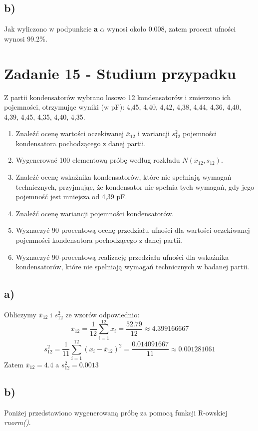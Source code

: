 \documentclass{article}
\begin{document}
\subsection{b)}
Jak wyliczono w podpunkcie \textbf{a} $\alpha$ wynosi około 0.008, zatem procent ufności wynosi 99.2\%.

\newpage
\section{Zadanie 15 - Studium przypadku}
Z partii kondensatorów wybrano losowo 12 kondensatorów i zmierzono ich pojemności, otrzymując wyniki (w pF):
4,45, 4,40, 4,42, 4,38, 4,44, 4,36, 4,40, 4,39, 4,45, 4,35, 4,40, 4,35.
\begin{enumerate}[label = \alph*)]
\item Znaleźć ocenę wartości oczekiwanej $\overline{x}_{12}$ i wariancji $s_{12}^2$ pojemności kondensatora pochodzącego z danej partii.
\item Wygenerować 100 elementową próbę według rozkładu $N(\overline{x}_{12},s_{12})$.
\item Znaleźć ocenę wskaźnika kondensatorów, które nie spełniają wymagań technicznych, przyjmując, że kondensator nie spełnia tych wymagań, gdy jego pojemność jest mniejsza od 4,39 pF.
\item Znaleźć ocenę wariancji pojemności kondensatorów.
\item Wyznaczyć 90-procentową ocenę przedziału ufności dla wartości oczekiwanej pojemności kondensatora pochodzącego z danej partii.
\item Wyznaczyć 90-procentową realizację przedziału ufności dla wskaźnika kondensatorów, które nie spełniają wymagań technicznych w badanej partii.
\end{enumerate}

\subsection{a)}
Obliczymy $\overline{x}_{12}$ i $s_{12}^2$ ze wzorów odpowiednio:
\[ \overline{x}_{12} = \frac{1}{12} \sum_{i=1}^{12} x_i = \frac{52.79}{12} \approx 4.399166667 \]
\[ s_{12}^2 = \frac{1}{11} \sum_{i=1}^{12} (x_i - \overline{x}_{12})^2 = \frac{0.014091667}{11} \approx 0.001281061 \]
Zatem $\overline{x}_{12} = 4.4$ a $s_{12}^2 = 0.0013$

\subsection{b)}
Poniżej przedstawiono wygenerowaną próbę za pomocą funkcji R-owskiej \textit{rnorm()}.
\begin{center}
\end{center}
\end{document}
